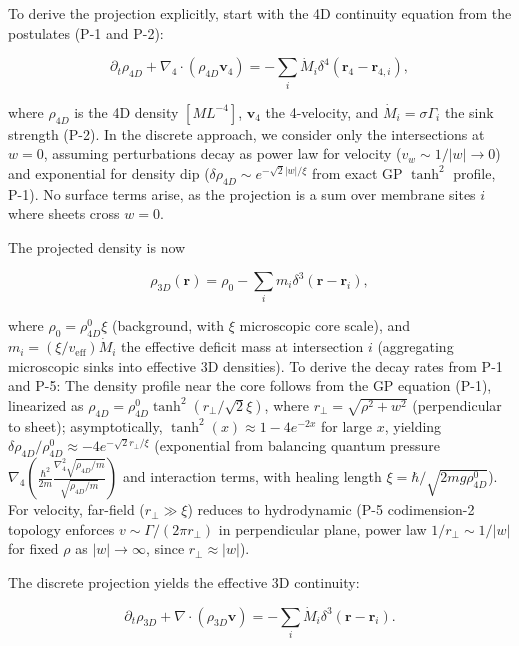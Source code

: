 To derive the projection explicitly, start with the 4D continuity equation from the postulates (P-1 and P-2):

\begin{equation}
\partial_t \rho_{4D} + \nabla_4 \cdot (\rho_{4D} \mathbf{v}_4) = -\sum_i \dot{M}_i \delta^4(\mathbf{r}_4 - \mathbf{r}_{4,i}),
\end{equation}

where $\rho_{4D}$ is the 4D density $[M L^{-4}]$, $\mathbf{v}_4$ the 4-velocity, and $\dot{M}_i = \sigma \Gamma_i$ the sink strength (P-2). In the discrete approach, we consider only the intersections at $w=0$, assuming perturbations decay as power law for velocity ($v_w \sim 1/|w| \to 0$) and exponential for density dip ($\delta \rho_{4D} \sim e^{-\sqrt{2} |w|/\xi}$ from exact GP $\tanh^2$ profile, P-1). No surface terms arise, as the projection is a sum over membrane sites $i$ where sheets cross $w=0$.

The projected density is now

\[
\rho_{3D}(\mathbf{r}) = \rho_0 - \sum_i m_i \delta^3(\mathbf{r} - \mathbf{r}_i),
\]

where $\rho_0 = \rho_{4D}^0 \xi$ (background, with $\xi$ microscopic core scale), and $m_i = (\xi / v_{\text{eff}}) \dot{M}_i$ the effective deficit mass at intersection $i$ (aggregating microscopic sinks into effective 3D densities). To derive the decay rates from P-1 and P-5: The density profile near the core follows from the GP equation (P-1), linearized as $\rho_{4D} = \rho_{4D}^0 \tanh^2 (r_\perp / \sqrt{2} \xi)$, where $r_\perp = \sqrt{\rho^2 + w^2}$ (perpendicular to sheet); asymptotically, $\tanh^2(x) \approx 1 - 4 e^{-2x}$ for large $x$, yielding $\delta \rho_{4D} / \rho_{4D}^0 \approx -4 e^{-\sqrt{2} r_\perp / \xi}$ (exponential from balancing quantum pressure $\nabla_4 \left( \frac{\hbar^2}{2 m} \frac{\nabla_4^2 \sqrt{\rho_{4D}/m}}{\sqrt{\rho_{4D}/m}} \right)$ and interaction terms, with healing length $\xi = \hbar / \sqrt{2 m g \rho_{4D}^0}$). For velocity, far-field ($r_\perp \gg \xi$) reduces to hydrodynamic (P-5 codimension-2 topology enforces $v \sim \Gamma / (2\pi r_\perp)$ in perpendicular plane, power law $1/r_\perp \sim 1/|w|$ for fixed $\rho$ as $|w| \to \infty$, since $r_\perp \approx |w|$).

The discrete projection yields the effective 3D continuity:

\[
\partial_t \rho_{3D} + \nabla \cdot (\rho_{3D} \mathbf{v}) = -\sum_i \dot{M}_i \delta^3(\mathbf{r} - \mathbf{r}_i).
\]

